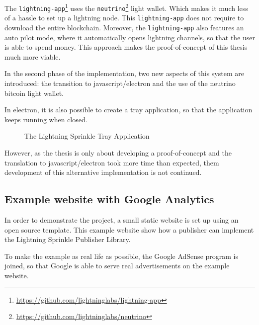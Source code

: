 The \texttt{lightning-app}\footnote{\url{https://github.com/lightninglabs/lightning-app}} uses the \texttt{neutrino}\footnote{\url{https://github.com/lightninglabs/neutrino}} light wallet. Which makes it much less of a hassle to set up a lightning node. This \texttt{lightning-app} does not require to download the entire blockchain. Moreover, the \texttt{lightning-app} also features an auto pilot mode, where it automatically opens lightning channels, so that the user is able to spend money. This approach makes the proof-of-concept of this thesis much more viable. 

In the second phase of the implementation, two new aspects of this system are introduced: the transition to javascript/electron and the use of the neutrino bitcoin light wallet.

In electron, it is also possible to create a tray application, so that the application keeps running when closed. 


\begin{figure}[h!]
  \setlength{\fboxsep}{0pt}%
  \center
  \caption{The Lightning Sprinkle Tray Application}
\end{figure}

However, as the thesis is only about developing a proof-of-concept and the translation to javascript/electron took more time than expected, them development of this alternative implementation is not continued.

\subsection{Example website with Google Analytics}
In order to demonstrate the project, a small static website is set up using an open source template. This example website show how a publisher can implement the Lightning Sprinkle Publisher Library. 

To make the example as real life as possible, the Google AdSense program is joined, so that Google is able to serve real advertisements on the example website. 

